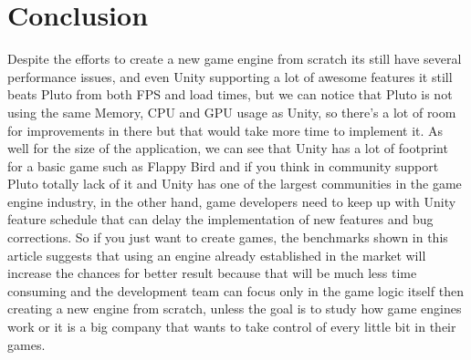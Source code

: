 \section{Conclusion}
Despite the efforts to create a new game engine from scratch its still have several performance issues, and even Unity supporting a lot of awesome features it still beats Pluto from both FPS and load times, but we can notice that Pluto is not using the same Memory, CPU and GPU usage as Unity, so there's a lot of room for improvements in there but that would take more time to implement it. As well for the size of the application, we can see that Unity has a lot of footprint for a basic game such as Flappy Bird and if you think in community support Pluto totally lack of it and Unity has one of the largest communities in the game engine industry, in the other hand, game developers need to keep up with Unity feature schedule that can delay the implementation of new features and bug corrections. So if you just want to create games, the benchmarks shown in this article suggests that using an engine already established in the market will increase the chances for better result because that will be much less time consuming and the development team can focus only in the game logic itself then creating a new engine from scratch, unless the goal is to study how game engines work or it is a big company that wants to take control of every little bit in their games.